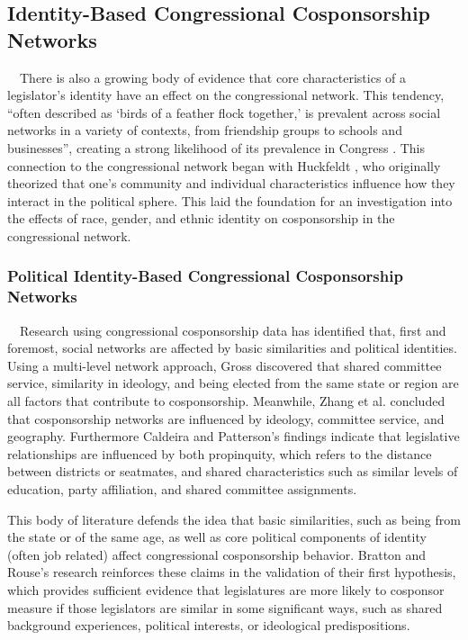 \documentclass[Royal,times,sageh]{sagej}
\begin{document}
\hypertarget{identity-based-congressional-cosponsorship-networks}{%
\subsection{Identity-Based Congressional Cosponsorship
Networks}\label{identity-based-congressional-cosponsorship-networks}}

~~There is also a growing body of evidence that core characteristics of
a legislator's identity have an effect on the congressional network.
This tendency, ``often described as `birds of a feather flock together,'
is prevalent across social networks in a variety of contexts, from
friendship groups to schools and businesses'', creating a strong
likelihood of its prevalence in Congress \citep[pg. 2]{craig2015}. This
connection to the congressional network began with Huckfeldt
\citeyearpar{huckfeldt1983}, who originally theorized that one's
community and individual characteristics influence how they interact in
the political sphere. This laid the foundation for an investigation into
the effects of race, gender, and ethnic identity on cosponsorship in the
congressional network.

\hypertarget{political-identity-based-congressional-cosponsorship-networks}{%
\subsubsection{Political Identity-Based Congressional Cosponsorship
Networks}\label{political-identity-based-congressional-cosponsorship-networks}}

~~Research using congressional cosponsorship data has identified that,
first and foremost, social networks are affected by basic similarities
and political identities. Using a multi-level network approach, Gross
\citeyearpar{gross2007} discovered that shared committee service,
similarity in ideology, and being elected from the same state or region
are all factors that contribute to cosponsorship. Meanwhile, Zhang et
al. \citeyearpar{zhang2007} concluded that cosponsorship networks are
influenced by ideology, committee service, and geography. Furthermore
Caldeira and Patterson's \citeyearpar{caldeira} findings indicate that
legislative relationships are influenced by both propinquity, which
refers to the distance between districts or seatmates, and shared
characteristics such as similar levels of education, party affiliation,
and shared committee assignments.

This body of literature defends the idea that basic similarities, such
as being from the state or of the same age, as well as core political
components of identity (often job related) affect congressional
cosponsorship behavior. Bratton and Rouse's \citeyearpar{bratton2011}
research reinforces these claims in the validation of their first
hypothesis, which provides sufficient evidence that legislatures are
more likely to cosponsor measure if those legislators are similar in
some significant ways, such as shared background experiences, political
interests, or ideological predispositions.
\end{document}
